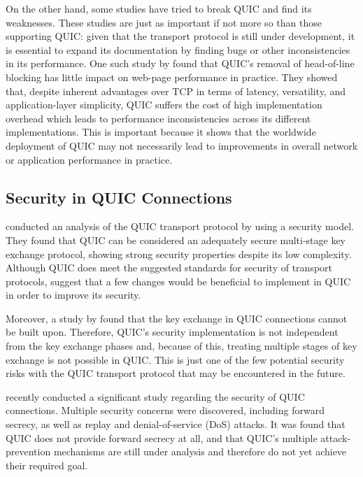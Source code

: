 \documentclass{l4proj}
\begin{document}
On the other hand, some studies have tried to break QUIC and find its weaknesses. These studies are just as important if not more so than those supporting QUIC: given that the transport protocol is still under development, it is essential to expand its documentation by finding bugs or other inconsistencies in its performance. One such study by \cite{Yu2021}  found that QUIC’s removal of head-of-line blocking has little impact on web-page performance in practice. They showed that, despite inherent advantages over TCP in terms of latency, versatility, and application-layer simplicity, QUIC suffers the cost of high implementation overhead which leads to performance inconsistencies across its different implementations. This is important because it shows that the worldwide deployment of QUIC may not necessarily lead to improvements in overall network or application performance in practice. 

\subsection{Security in QUIC Connections}

\citet{Fisch2014} conducted an analysis of the QUIC transport protocol by using a security model. They found that QUIC can be considered an adequately secure multi-stage key exchange protocol, showing strong security properties despite its low complexity. Although QUIC does meet the suggested standards for security of transport protocols, \citet{Fisch2014} suggest that a few changes would be beneficial to implement in QUIC in order to improve its security.

Moreover, a study by \citet{Lychev2015} found that the key exchange in QUIC connections cannot be built upon. Therefore, QUIC’s security implementation is not independent from the key exchange phases and, because of this, treating multiple stages of key exchange is not possible in QUIC. This is just one of the few potential security risks with the QUIC transport protocol that may be encountered in the future.

\citet{Soni2021} recently conducted a significant study regarding the security of QUIC connections. Multiple security concerns were discovered, including forward secrecy, as well as replay and denial-of-service (DoS) attacks. It was found that QUIC does not provide forward secrecy at all, and that QUIC's multiple attack-prevention mechanisms are still under analysis and therefore do not yet achieve their required goal.
\end{document}

